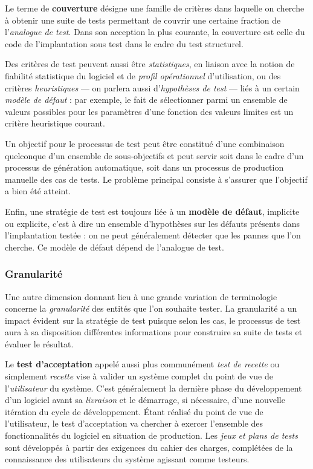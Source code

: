 Le terme de \textbf{couverture} d\'esigne une famille de
crit\`eres dans laquelle on cherche \`a obtenir une suite de
tests permettant de couvrir une certaine fraction de l'\emph{analogue
  de test}. Dans son acception la plus courante, la couverture est
celle du code de l'implantation sous test dans le cadre du test structurel. 

Des crit\`eres de test peuvent aussi \^etre
\emph{statistiques}, en liaison avec la notion de fiabilit\'e statistique du
logiciel et de \emph{profil op\'erationnel} d'utilisation, ou des
crit\`eres \emph{heuristiques} --- on parlera aussi d'\emph{hypoth\`eses de
  test} --- li\'es \`a un certain \emph{mod\`ele de d\'efaut} :
par exemple, le fait de s\'electionner parmi un ensemble de valeurs
possibles pour les param\`etres d'une fonction des valeurs limites
est un crit\`ere heuristique courant. 

Un objectif pour le processus de test peut \^etre constitu\'e d'une
combinaison quelconque d'un ensemble de sous-objectifs et peut servir
soit dans le cadre d'un processus de g\'en\'eration automatique,
soit dans un processus de production manuelle des cas de tests. Le
probl\`eme principal consiste \`a s'assurer que
l'objectif a bien \'et\'e atteint.

Enfin, une strat\'egie de test est toujours li\'ee \`a un \textbf{mod\`ele
de d\'efaut}, implicite ou explicite, c'est \`a dire un ensemble
d'hypoth\`eses sur les d\'efauts pr\'esents dans l'implantation test\'ee : on ne peut
g\'en\'eralement d\'etecter que les pannes que l'on cherche. Ce
mod\`ele de d\'efaut d\'epend  de l'analogue de test. 

\subsubsection{Granularit\'e}

Une autre dimension donnant lieu \`a une grande variation de
terminologie concerne la \emph{granularit\'e} des entit\'es que l'on
souhaite tester. La granularit\'e a un impact \'evident sur la
strat\'egie de test puisque selon les cas, le processus de test aura
\`a sa disposition diff\'erentes informations pour construire sa
suite de tests et \'evaluer le r\'esultat.

Le \textbf{test d'acceptation} appel\'e aussi plus commun\'ement \emph{test de
recette} ou simplement \emph{recette} vise \`a valider un syst\`eme
complet du point de vue de l'\emph{utilisateur} du syst\`eme. C'est
g\'en\'eralement la derni\`ere phase du d\'eveloppement d'un
logiciel avant sa \emph{livraison} et  le
d\'emarrage, si n\'ecessaire, d'une nouvelle it\'eration du cycle de
d\'eveloppement. \'Etant r\'ealis\'e du point de vue de
l'utilisateur, le test d'acceptation va chercher \`a exercer
l'ensemble des fonctionnalit\'es du logiciel en situation de
production. Les \emph{jeux et plans de tests} sont d\'evelopp\'es
\`a partir des exigences du cahier des charges, compl\'et\'ees de la
connaissance des utilisateurs du syst\`eme agissant comme testeurs.

